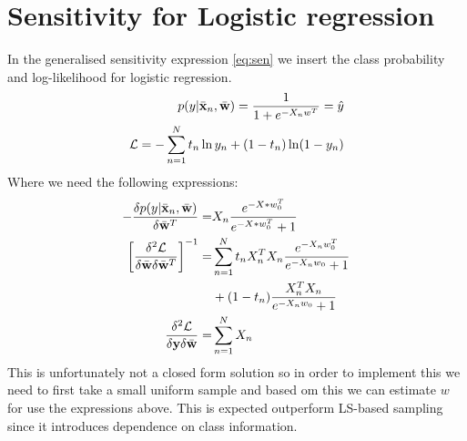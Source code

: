 \section{Sensitivity for Logistic regression}
In the generalised sensitivity expression \eqref{eq:sen} we insert the class probability and log-likelihood for logistic regression.
\begin{align*}
p(y|\bar{{\bf x}}_n,\bar{{\bf w}}) = \frac{1}{1+ e^{-X_nw^T}} = \hat{y}\\
\mathcal{L} = - \sum_{n=1}^{N} t_n \ln y_n + (1-t_n)\ln(1-y_n) \\
\end{align*}
Where we need the following expressions:
\begin{align*}
- \frac{\delta p(y|\bar{{\bf x}}_n,\bar{{\bf w}})}{\delta \bar{{\bf w}}^T}=&
X_n\frac{e^{-X*w_0^T}}{e^{-X*w_0^T}+1}\\
 \left[ \frac{\delta^2 \mathcal{L}}{\delta \bar{{\bf w}} \delta \bar{{\bf w}}^T} \right]^{-1}=&
 \sum_{n=1}^{N}  t_n X_n^T X_n \frac{e^{-X_n w_0^T}}{e^{-X_nw_0}+1}\\&+(1-t_n) \frac{X_n^T X_n}{e^{-X_nw_0}+1}\\
 \frac{\delta^2 \mathcal{L}}{\delta {\bf y} \delta \bar{{\bf w}}}=& \sum_{n=1}^{N} X_n
\end{align*}
This is unfortunately not a closed form solution so in order to implement this we need to first take a small uniform sample and based om this we can estimate $w$ for use the expressions above. 	This is expected outperform LS-based sampling since it introduces dependence on class information.
